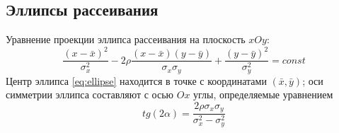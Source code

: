 \subsection{Эллипсы рассеивания}
Уравнение проекции эллипса рассеивания на плоскость $xOy$:
\begin{equation}
\frac{(x-\bar{x})^{2}}{\sigma_{x}^{2}} -
2\rho\frac{(x-\bar{x})(y-\bar{y})}{\sigma_{x}\sigma_{y}}+
\frac{(y-\bar{y})^{2}}{\sigma_{y}^{2}} = const
\label{eq:ellipse}
\end{equation}
Центр эллипса \eqref{eq:ellipse} находится в точке с координатами $(\bar{x},\bar{y})$;
оси симметрии эллипса составляют с осью $Ox$ углы, определяемые уравнением
\begin{equation}
tg(2\alpha) = \frac{2\rho\sigma_{x}\sigma_{y}}{\sigma_{x}^{2} - \sigma_{y}^{2}}
\label{eq:angle}
\end{equation}
